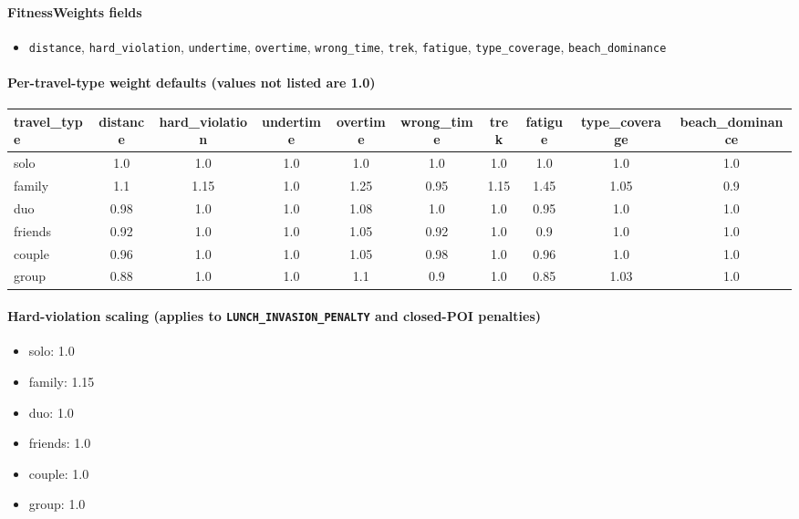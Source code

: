 \documentclass[11pt]{article}
\begin{document}
\paragraph{FitnessWeights fields}
\begin{itemize}
  \item \texttt{distance}, \texttt{hard\_violation}, \texttt{undertime}, \texttt{overtime}, \texttt{wrong\_time}, \texttt{trek}, \texttt{fatigue}, \texttt{type\_coverage}, \texttt{beach\_dominance}
\end{itemize}

\paragraph{Per-travel-type weight defaults (values not listed are 1.0)}
\begin{table}[h]
\centering
\small
\begin{tabular}{lccccccccc}
\textbf{travel\_type} & \textbf{distance} & \textbf{hard\_violation} & \textbf{undertime} & \textbf{overtime} & \textbf{wrong\_time} & \textbf{trek} & \textbf{fatigue} & \textbf{type\_coverage} & \textbf{beach\_dominance} \\
\hline
solo & 1.0 & 1.0 & 1.0 & 1.0 & 1.0 & 1.0 & 1.0 & 1.0 & 1.0 \\
family & 1.1 & 1.15 & 1.0 & 1.25 & 0.95 & 1.15 & 1.45 & 1.05 & 0.9 \\
duo & 0.98 & 1.0 & 1.0 & 1.08 & 1.0 & 1.0 & 0.95 & 1.0 & 1.0 \\
friends & 0.92 & 1.0 & 1.0 & 1.05 & 0.92 & 1.0 & 0.9 & 1.0 & 1.0 \\
couple & 0.96 & 1.0 & 1.0 & 1.05 & 0.98 & 1.0 & 0.96 & 1.0 & 1.0 \\
group & 0.88 & 1.0 & 1.0 & 1.1 & 0.9 & 1.0 & 0.85 & 1.03 & 1.0 \\
\end{tabular}
\end{table}

\paragraph{Hard-violation scaling (applies to \texttt{LUNCH\_INVASION\_PENALTY} and closed-POI penalties)}
\begin{itemize}
  \item solo: 1.0
  \item family: 1.15
  \item duo: 1.0
  \item friends: 1.0
  \item couple: 1.0
  \item group: 1.0
\end{itemize}
\end{document}
